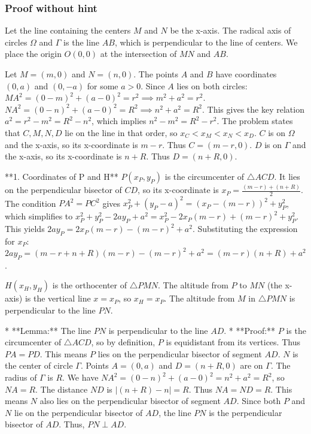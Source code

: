 \subsubsection{Proof without hint}

Let the line containing the centers $M$ and $N$ be the x-axis. The radical axis of circles $\Omega$ and $\Gamma$ is the line $AB$, which is perpendicular to the line of centers. We place the origin $O(0,0)$ at the intersection of $MN$ and $AB$.

Let $M=(m,0)$ and $N=(n,0)$. The points $A$ and $B$ have coordinates $(0,a)$ and $(0,-a)$ for some $a>0$. Since $A$ lies on both circles:
$MA^2 = (0-m)^2 + (a-0)^2 = r^2 \implies m^2+a^2=r^2$.
$NA^2 = (0-n)^2 + (a-0)^2 = R^2 \implies n^2+a^2=R^2$.
This gives the key relation $a^2 = r^2-m^2 = R^2-n^2$, which implies $n^2-m^2=R^2-r^2$.
The problem states that $C, M, N, D$ lie on the line in that order, so $x_C < x_M < x_N < x_D$.
$C$ is on $\Omega$ and the x-axis, so its x-coordinate is $m-r$. Thus $C=(m-r,0)$.
$D$ is on $\Gamma$ and the x-axis, so its x-coordinate is $n+R$. Thus $D=(n+R,0)$.

**1. Coordinates of P and H**
$P(x_P, y_P)$ is the circumcenter of $\triangle ACD$. It lies on the perpendicular bisector of $CD$, so its x-coordinate is $x_P = \frac{(m-r)+(n+R)}{2}$.
The condition $PA^2=PC^2$ gives $x_P^2 + (y_P-a)^2 = (x_P-(m-r))^2 + y_P^2$, which simplifies to $x_P^2 + y_P^2 - 2ay_P + a^2 = x_P^2 - 2x_P(m-r) + (m-r)^2 + y_P^2$. This yields $2ay_P = 2x_P(m-r) - (m-r)^2 + a^2$. Substituting the expression for $x_P$:
$2ay_P = (m-r+n+R)(m-r) - (m-r)^2 + a^2 = (m-r)(n+R)+a^2$.

$H(x_H, y_H)$ is the orthocenter of $\triangle PMN$. The altitude from $P$ to $MN$ (the x-axis) is the vertical line $x=x_P$, so $x_H=x_P$.
The altitude from $M$ in $\triangle PMN$ is perpendicular to the line $PN$.

*   **Lemma:** The line $PN$ is perpendicular to the line $AD$.
*   **Proof:** $P$ is the circumcenter of $\triangle ACD$, so by definition, $P$ is equidistant from its vertices. Thus $PA=PD$. This means $P$ lies on the perpendicular bisector of segment $AD$.
    $N$ is the center of circle $\Gamma$. Points $A=(0,a)$ and $D=(n+R,0)$ are on $\Gamma$. The radius of $\Gamma$ is $R$. We have $NA^2 = (0-n)^2+(a-0)^2 = n^2+a^2=R^2$, so $NA=R$. The distance $ND$ is $|(n+R)-n|=R$. Thus $NA=ND=R$. This means $N$ also lies on the perpendicular bisector of segment $AD$.
    Since both $P$ and $N$ lie on the perpendicular bisector of $AD$, the line $PN$ is the perpendicular bisector of $AD$. Thus, $PN \perp AD$.

